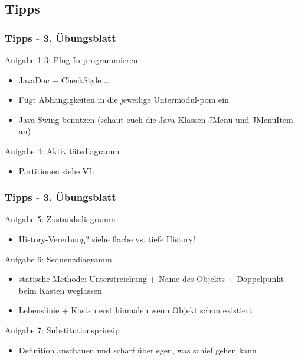 \documentclass[18pt]{beamer}
\begin{document}
	\subsection{Tipps}
	\begin{frame}
		\frametitle{Tipps - 3. Übungsblatt}
			\begin{exampleblock}{Aufgabe 1-3: Plug-In programmieren}
				\begin{itemize}
					\pause
					\item JavaDoc + CheckStyle \dots \pause
					\item Fügt Abhängigkeiten in die jeweilige Untermodul-pom ein \pause
					\item Java Swing benutzen (schaut euch die Java-Klassen JMenu und JMenuItem an)
				\end{itemize}
			\end{exampleblock}
			\pause
			\begin{exampleblock}{Aufgabe 4: Aktivitätsdiagramm}
				\begin{itemize}
					\item Partitionen siehe VL
				\end{itemize}
			\end{exampleblock}
	\end{frame}

	\begin{frame}
		\frametitle{Tipps - 3. Übungsblatt}
			\begin{exampleblock}{Aufgabe 5: Zustandsdiagramm}
				\begin{itemize}
					\pause
					\item History-Vererbung? siehe flache vs. tiefe History!
				\end{itemize}
			\end{exampleblock}
			\pause
			\begin{exampleblock}{Aufgabe 6: Sequenzdiagramm}
				\begin{itemize}
					\pause
					\item statische Methode: Unterstreichung + Name des Objekts + Doppelpunkt beim Kasten weglassen 
					\pause
					\item Lebenslinie + Kasten erst hinmalen wenn Objekt schon existiert
				\end{itemize}
			\end{exampleblock}
			\pause
			\begin{exampleblock}{Aufgabe 7: Substitutionsprinzip}
				\begin{itemize}
					\item Definition anschauen und scharf überlegen, was schief gehen kann
				\end{itemize}
			\end{exampleblock}
	\end{frame}
\end{document}
